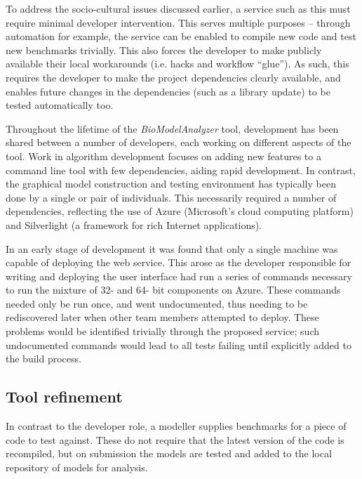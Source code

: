 \documentclass[conference]{IEEEtran}
\begin{document}
To address the socio-cultural issues discussed earlier, a
service such as this must require minimal developer intervention.
This serves multiple purposes -- through automation for example, the
service can be enabled to compile new code and test new benchmarks
trivially. This also forces the developer to make publicly available
their local workarounds (i.e. hacks and workflow ``glue''). As such, this requires the
developer to make the project dependencies clearly available, and
enables future changes in the dependencies (such as a library update)
to be tested automatically too.

Throughout the lifetime of the {\emph{BioModelAnalyzer}} tool,
development has been shared between a number of developers, each
working on different aspects of the tool. Work in algorithm
development focuses on adding new features to a command line tool with
few dependencies, aiding rapid development. In contrast, the graphical
model construction and testing environment has typically been done by
a single or pair of individuals.  This necessarily required a number
of dependencies, reflecting the use of Azure (Microsoft's cloud
computing platform) and Silverlight (a framework for rich Internet
applications).

In an early stage of development it was found that only a single
machine was capable of deploying the web service. This arose as the
developer responsible for writing and deploying the user interface had
run a series of commands necessary to run the mixture of 32- and 64-
bit components on Azure. These commands needed only be run once, and
went undocumented, thus needing to be rediscovered later when other
team members attempted to deploy. These problems would be identified
trivially through the proposed service; such undocumented commands
would lead to all tests failing until explicitly added to the build
process.

\subsection{Tool refinement}

In contrast to the developer role, a modeller supplies benchmarks for
a piece of code to test against. These do not require that the latest
version of the code is recompiled, but on submission the models are
tested and added to the local repository of models for analysis.
\end{document}
